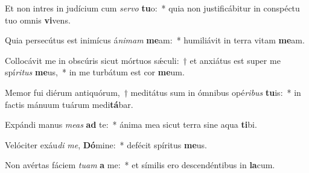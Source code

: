 \item Et non intres in judícium cum \textit{ser}\textit{vo} \textbf{tu}o:~* quia non justificábitur in conspéctu tuo omnis \textbf{vi}vens.
\item Quia persecútus est inimícus á\textit{ni}\textit{mam} \textbf{me}am:~* humiliávit in terra vitam \textbf{me}am.
\item Collocávit me in obscúris sicut mórtuos sǽculi:~† et anxiátus est super me spí\textit{ri}\textit{tus} \textbf{me}us,~* in me turbátum est cor \textbf{me}um.
\item Memor fui diérum antiquórum,~† meditátus sum in ómnibus opé\textit{ri}\textit{bus} \textbf{tu}is:~* in factis mánuum tuárum medi\textbf{tá}bar.
\item Expándi manus \textit{me}\textit{as} \textbf{ad} te:~* ánima mea sicut terra sine aqua \textbf{ti}bi.
\item Velóciter exáu\textit{di} \textit{me}, \textbf{Dó}mine:~* defécit spíritus \textbf{me}us.
\item Non avértas fáciem \textit{tu}\textit{am} \textbf{a} me:~* et símilis ero descendéntibus in \textbf{la}cum.
